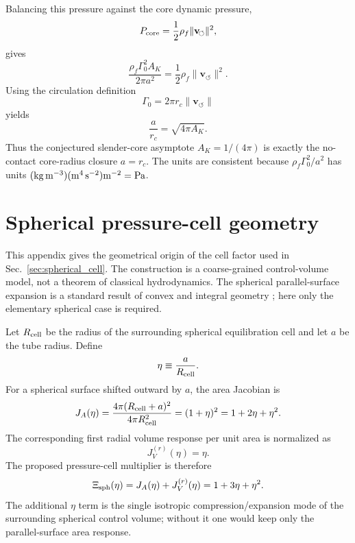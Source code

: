\documentclass[aps,pra,preprint,longbibliography,nofootinbib]{revtex4-2}
\newcommand{\vnorm}{\lVert\mathbf{v}_{\!\boldsymbol{\circlearrowleft}}\rVert} %
\begin{document}
Balancing this pressure against the core dynamic pressure,
\begin{equation}
  P_{\rm core}=\frac{1}{2}\rho_f\vnorm^2,
  \label{eq:app_pcore}
\end{equation}
gives
\begin{equation}
  \frac{\rho_f\Gamma_0^2 A_K}{2\pi a^2}
  =\frac{1}{2}\rho_f\vnorm^2 .
  \label{eq:app_balance}
\end{equation}
Using the circulation definition
\begin{equation}
  \Gamma_0=2\pi r_c\vnorm
  \label{eq:app_gamma}
\end{equation}
yields
\begin{equation}
  \boxed{\frac{a}{r_c}=\sqrt{4\pi A_K}} .
  \label{eq:app_anc}
\end{equation}
Thus the conjectured slender-core asymptote $A_K=1/(4\pi)$ is exactly the
no-contact core-radius closure $a=r_c$.  The units are consistent because
$\rho_f\Gamma_0^2/a^2$ has units
$({\rm kg\,m^{-3}})({\rm m^4\,s^{-2}}){\rm m^{-2}}={\rm Pa}$.

\section{Spherical pressure-cell geometry}
\label{app:spherical_geometry}

This appendix gives the geometrical origin of the cell factor used in
Sec.~\ref{sec:spherical_cell}.  The construction is a coarse-grained
control-volume model, not a theorem of classical hydrodynamics.  The
spherical parallel-surface expansion is a standard result of convex and
integral geometry \cite{Schneider2014}; here only the elementary spherical
case is required.

Let $R_{\rm cell}$ be the radius of the surrounding spherical equilibration
cell and let $a$ be the tube radius.  Define
\begin{equation}
  \eta\equiv \frac{a}{R_{\rm cell}} .
  \label{eq:app_eta_general}
\end{equation}
For a spherical surface shifted outward by $a$, the area Jacobian is
\begin{equation}
  J_A(\eta)
  =\frac{4\pi(R_{\rm cell}+a)^2}{4\pi R_{\rm cell}^2}
  =(1+\eta)^2
  =1+2\eta+\eta^2 .
  \label{eq:app_area_jacobian}
\end{equation}
The corresponding first radial volume response per unit area is normalized as
\begin{equation}
  J_V^{(r)}(\eta)=\eta .
  \label{eq:app_radial_volume}
\end{equation}
The proposed pressure-cell multiplier is therefore
\begin{equation}
  \Xi_{\rm sph}(\eta)=J_A(\eta)+J_V^{(r)}(\eta)
  =1+3\eta+\eta^2 .
  \label{eq:app_xi_general}
\end{equation}
The additional $\eta$ term is the single isotropic compression/expansion
mode of the surrounding spherical control volume; without it one would keep
only the parallel-surface area response.
\end{document}
